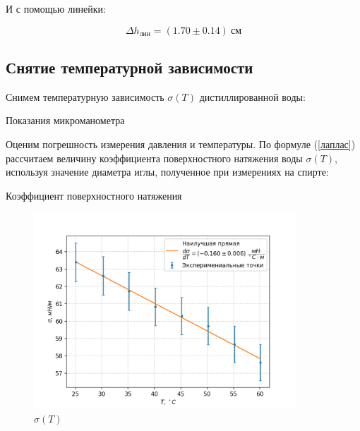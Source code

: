 \documentclass[a4paper,12pt]{article} %
\begin{document}
И с помощью линейки:

\begin{equation}\label{h_лин}
	\Delta h_{лин} = (1.70 \pm 0.14) \ см
\end{equation}

\subsection*{Снятие температурной зависимости}

Снимем температурную зависимость $\sigma(T)$ дистиллированной воды:

\begin{table}[ht!]
	\centering
	
	\caption{Показания микроманометра}
\end{table}

Оценим погрешность измерения давления и температуры. По формуле (\ref{лаплас}) рассчитаем величину коэффициента поверхностного натяжения воды $\sigma(T)$, используя значение диаметра иглы, полученное при измерениях на спирте:

\begin{table}[ht!]
	\centering
	
	\caption{Коэффициент поверхностного натяжения}
\end{table}

\newpage


\begin{figure}[h!]
\begin{center}
\includegraphics[width=0.875\textwidth]{8.png}
\end{center}
\caption{$\sigma(T)$}\label{sigma(T)}
\end{figure}
\end{document}
